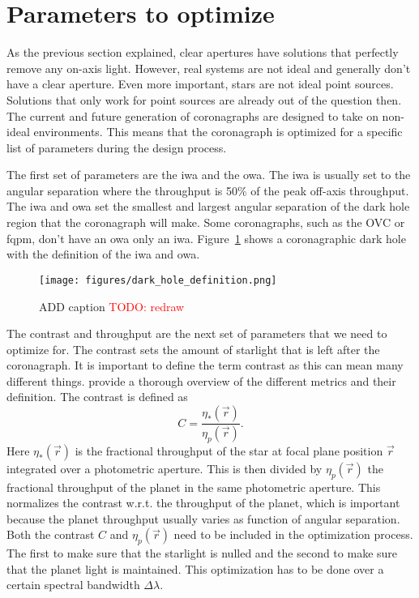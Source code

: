 \documentclass[letterpaper]{ar-1col}
\newcommand{\acc}[1]{\entry{\acs{#1}}{\acl{#1}}}
\begin{document}
\section{Parameters to optimize}


\begin{armarginnote}[]
\acc{iwa}
\acc{owa}
\end{armarginnote}

As the previous section explained, clear apertures have solutions that perfectly remove any on-axis light.
%
However, real systems are not ideal and generally don't have a clear aperture.
%
Even more important, stars are not ideal point sources.
%
Solutions that only work for point sources are already out of the question then.
%
The current and future generation of coronagraphs are designed to take on non-ideal environments.
%
This means that the coronagraph is optimized for a specific list of parameters during the design process.

The first set of parameters are the \ac{iwa} and the \ac{owa}.
%
The \ac{iwa} is usually set to the angular separation where the throughput is 50\% of the peak off-axis throughput.
%
The \ac{iwa} and \ac{owa} set the smallest and largest angular separation of the dark hole region that the coronagraph will make.
%
Some coronagraphs, such as the OVC or \ac{fqpm}, don't have an \ac{owa} only an \ac{iwa}.
%
Figure~\ref{fig:coronagraph_focal_plane_definitions} shows a coronagraphic dark hole with the definition of the \ac{iwa} and \ac{owa}.

\begin{figure}[ht]
  \centering
  \texttt{[image: figures/dark\_hole\_definition.png]}
  \caption{ADD caption \textcolor{red}{TODO: redraw}}
  \label{fig:coronagraph_focal_plane_definitions}
\end{figure}

The contrast and throughput are the next set of parameters that we need to optimize for.
%
The contrast sets the amount of starlight that is left after the coronagraph.
%
It is important to define the term contrast as this can mean many different things.
%
\citet{ruane2018review} provide a thorough overview of the different metrics and their definition.
%
The contrast is defined as
\begin{equation}
C = \frac{\eta_*(\vec{r})}{\eta_p(\vec{r})}.
\end{equation}
Here $\eta_*(\vec{r})$ is the fractional throughput of the star at focal plane position $\vec{r}$ integrated over a photometric aperture.
%
This is then divided by $\eta_p(\vec{r})$ the fractional throughput of the planet in the same photometric aperture.
%
This normalizes the contrast w.r.t. the throughput of the planet, which is important because the planet throughput usually varies as function of angular separation.
%
Both the contrast $C$ and $\eta_p(\vec{r})$ need to be included in the optimization process.
%
The first to make sure that the starlight is nulled and the second to make sure that the planet light is maintained.
%
This optimization has to be done over a certain spectral bandwidth $\Delta \lambda$.
\end{document}
